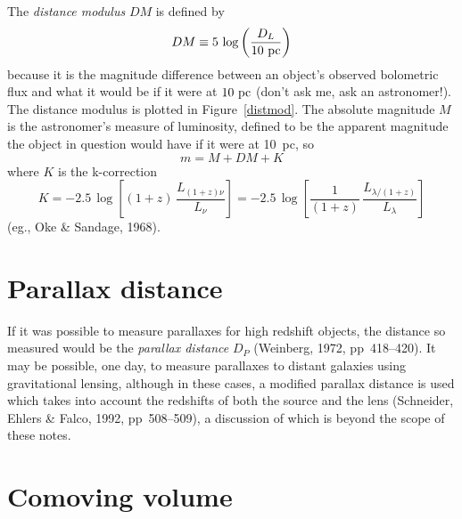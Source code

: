 The {\em distance modulus\/} $DM$ is defined by
\begin{equation}
DM\equiv 5\,\log \left(\frac{D_L}{10~{\rm pc}}\right)
\end{equation}
because it is the magnitude difference between an object's observed
bolometric flux and what it would be if it were at $10~{\rm pc}$
(don't ask me, ask an astronomer!).  The distance modulus is plotted
in Figure~\ref{distmod}.  The absolute magnitude $M$ is the
astronomer's measure of luminosity, defined to be the apparent
magnitude the object in question would have if it were at 10~pc, so
\begin{equation}
m=M+DM+K
\end{equation}
where $K$ is the k-correction
\begin{equation}
K = -2.5\,\log\left[(1+z)\,\frac{L_{(1+z)\nu}}{L_{\nu}}\right]=
-2.5\,\log \left[\frac{1}{(1+z)}\,\frac{L_{\lambda/(1+z)}}{L_{\lambda}}\right]
\end{equation}
(eg., Oke \& Sandage, 1968).


\section{Parallax distance}

If it was possible to measure parallaxes for high redshift objects,
the distance so measured would be the {\em parallax distance\/} $D_P$
(Weinberg, 1972, pp~418--420).  It may be possible,
one day, to measure parallaxes to distant galaxies using gravitational
lensing, although in these cases, a modified parallax distance is used
which takes into account the redshifts of both the source and the
lens (Schneider, Ehlers \& Falco, 1992, pp~508--509), a discussion of
which is beyond the scope of these notes.


\section{Comoving volume}

